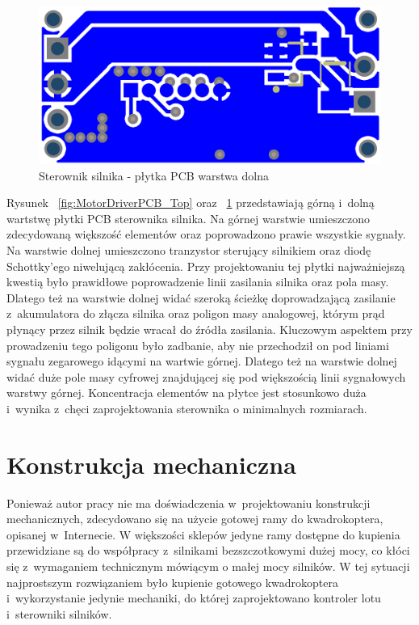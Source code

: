 \documentclass[11pt, twoside]{Thesis} %
\begin{document}
\begin{figure}[H]
	\centering
	\includegraphics[scale=0.4]{Pictures/MotorDriverPCB_Bottom.png}
		\caption[Sterownik silnika - płytka PCB warstwa dolna]{Sterownik silnika - płytka PCB warstwa dolna}
	\label{fig:MotorDriverPCB_Bottom}
\end{figure}

Rysunek ~\ref{fig:MotorDriverPCB_Top} oraz ~\ref{fig:MotorDriverPCB_Bottom} przedstawiają górną i~dolną wartstwę płytki PCB sterownika silnika. Na górnej warstwie umieszczono zdecydowaną większość elementów oraz poprowadzono prawie wszystkie sygnały. Na warstwie dolnej umieszczono tranzystor sterujący silnikiem oraz diodę Schottky'ego niwelującą zakłócenia. Przy projektowaniu tej płytki najważniejszą kwestią było prawidłowe poprowadzenie linii zasilania silnika oraz pola masy. Dlatego też na warstwie dolnej widać szeroką ścieżkę doprowadzającą zasilanie z~akumulatora do złącza silnika oraz poligon masy analogowej, którym prąd płynący przez silnik będzie wracał do źródła zasilania. Kluczowym aspektem przy prowadzeniu tego poligonu było zadbanie, aby nie przechodził on pod liniami sygnału zegarowego idącymi na wartwie górnej. Dlatego też na warstwie dolnej widać duże pole masy cyfrowej znajdującej się pod większością linii sygnałowych warstwy górnej. Koncentracja elementów na płytce jest stosunkowo duża i~wynika z~chęci zaprojektowania sterownika o minimalnych rozmiarach. 

\section{Konstrukcja mechaniczna}

Ponieważ autor pracy nie ma doświadczenia w~projektowaniu konstrukcji mechanicznych, zdecydowano się na użycie gotowej ramy do kwadrokoptera, opisanej w~Internecie. W większości sklepów jedyne ramy dostępne do kupienia przewidziane są do współpracy z~silnikami bezszczotkowymi dużej mocy, co kłóci się z~wymaganiem technicznym mówiącym o małej mocy silników. W tej sytuacji najprostszym rozwiązaniem było kupienie gotowego kwadrokoptera i~wykorzystanie jedynie mechaniki, do której zaprojektowano kontroler lotu i~sterowniki silników. 
\end{document}
